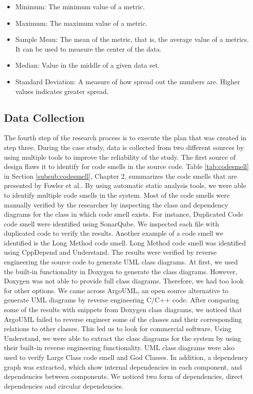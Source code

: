 \begin{itemize}
	\item Minimum: The minimum value of a metric.
	\item Maximum: The maximum value of a metric.
	\item Sample Mean: The mean of the metric, that is, the average value of a metrics. It can be used to measure the center of the data.
	\item Median: Value in the middle of a given data set.
	\item Standard Deviation: A measure of how spread out the numbers are. Higher values indicates greater spread.
\end{itemize}



\subsection{Data Collection}
The fourth step of the research process is to execute the plan that was created in step three. During the case study, data is collected from two different sources by using multiple tools to improve the reliability of the study. The first source of design flaws it to identify for code smells in the source code. Table \ref{tab:codesmell} in Section \ref{subsub:codesmell}, Chapter 2, summarizes the code smells that are presented by Fowler et al.\cite{fowler1999refactoring}. By using automatic static analysis tools, we were able to identify multiple code smells in the system. Most of the code smells were manually verified by the researcher by inspecting the class and dependency diagrams for the class in which code smell exists. For instance, Duplicated Code code smell were identified using SonarQube. We inspected each file with duplicated code to verify the results. Another example of a code smell we identified is the Long Method code smell. Long Method code smell was identified using CppDepend and Understand. The results were verified by reverse engineering the source code to generate UML class diagrams. At first, we used the built-in functionality in Doxygen to generate the class diagrams. However, Doxygen was not able to provide full class diagrams. Therefore, we had too look for other options. We came across ArgoUML, an open source alternative to generate UML diagrams by reverse engineering C/C++ code. After comparing some of the results with snippets from Doxygen class diagrams, we noticed that ArgoUML failed to reverse engineer some of the classes and their corresponding relations to other classes. This led us to look for commercial software. Using Understand, we were able to extract the class diagrams for the system by using their built-in reverse engineering functionality. UML class diagrams were also used to verify Large Class code smell and God Classes. In addition, a dependency graph was extracted, which show internal dependencies in each component, and dependencies between components. We noticed two form of dependencies, direct dependencies and circular dependencies. 

